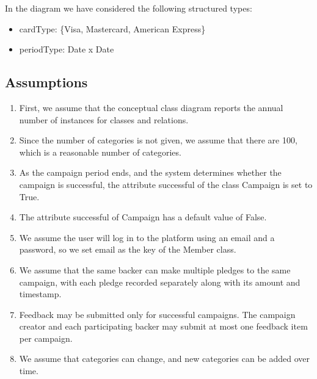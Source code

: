 \documentclass[pdflatex,sn-mathphys-num]{sn-jnl}
\begin{document}
In the diagram we have considered the following structured types:
\begin{itemize}
    \item cardType: \{Visa, Mastercard, American Express\}
    \item periodType: Date x Date
\end{itemize}
\subsection{Assumptions}
\begin{enumerate}
\item First, we assume that the conceptual class diagram reports the annual number of instances for classes and relations.
\item Since the number of categories is not given, we assume that there are 100, which is a reasonable number of categories.
\item As the campaign period ends, and the system determines whether the campaign is successful, the attribute successful of the class Campaign is set to True.
\item The attribute successful of Campaign has a default value of False.
\item We assume the user will log in to the platform using an email and a password, so we set email as the key of the Member class.
\item We assume that the same backer can make multiple pledges to the same campaign, with each pledge recorded separately along with its amount and timestamp.
\item Feedback may be submitted only for successful campaigns. The campaign creator and each participating backer may submit at most one feedback item per campaign. 
\item We assume that categories can change, and new categories can be added over time. 
\end{enumerate}
\end{document}
